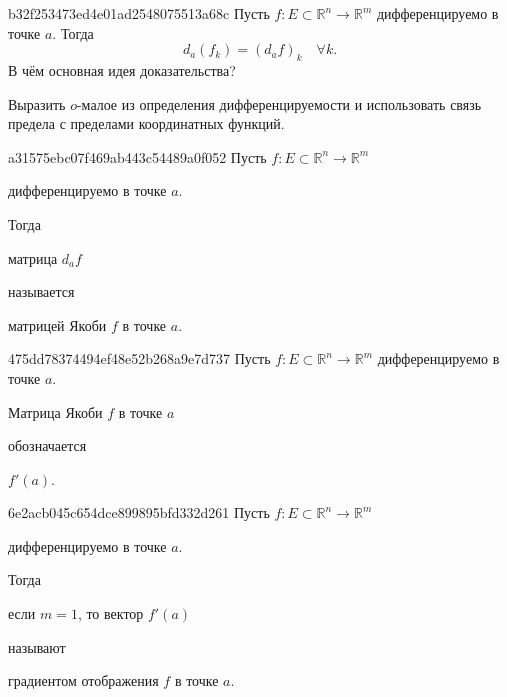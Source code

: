 \begin{note}{b32f253473ed4e01ad2548075513a68c}
    Пусть \({ f : E \subset \mathbb R^{n} \to \mathbb R^{m} }\) дифференцируемо в точке \({ a }\).
    Тогда
    \[
        d_{a} (f_k) = (d_{a} f)_k \quad \forall k.
    \]
    В чём основная идея доказательства?

    \begin{cloze}{1}
        Выразить \({ o }\)-малое из определения дифференцируемости и использовать связь предела с пределами координатных функций.
    \end{cloze}
\end{note}

\begin{note}{a31575ebc07f469ab443c54489a0f052}
    Пусть \({ f : E \subset \mathbb R^{n} \to \mathbb R^{m} }\) \begin{icloze}{3}дифференцируемо в точке \({ a }\).\end{icloze}
    Тогда \begin{icloze}{1}матрица \({ d_{a}f }\)\end{icloze} называется \begin{icloze}{2}матрицей Якоби \({ f }\) в точке \({ a }\).\end{icloze}
\end{note}

\begin{note}{475dd78374494ef48e52b268a9e7d737}
    Пусть \({ f : E \subset \mathbb R^{n} \to \mathbb R^{m} }\) дифференцируемо в точке \({ a }\).
    \begin{icloze}{2}Матрица Якоби \({ f }\) в точке \({ a }\)\end{icloze} обозначается \begin{icloze}{1}\({ f'(a) }\).\end{icloze}
\end{note}

\begin{note}{6e2acb045c654dce899895bfd332d261}
    Пусть \({ f : E \subset \mathbb R^{n} \to \mathbb R^{m} }\) \begin{icloze}{3}дифференцируемо в точке \({ a }\).\end{icloze}
    Тогда \begin{icloze}{1}если \({ m = 1 }\), то вектор \({ f'(a) }\)\end{icloze} называют \begin{icloze}{2}градиентом отображения \({ f }\) в точке \({ a }\).\end{icloze}
\end{note}

